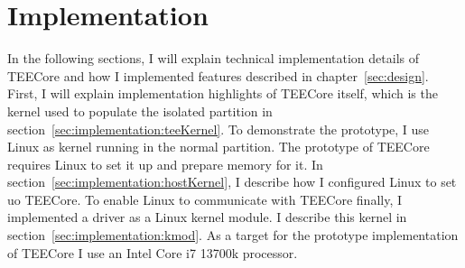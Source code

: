 \chapter{Implementation}
\label{sec:implementation}


In the following sections, I will explain technical implementation details of
TEECore and how I implemented features described in chapter~\ref{sec:design}.
First, I will explain implementation highlights of TEECore itself, which is the
kernel used to populate the isolated partition in
section~\ref{sec:implementation:teeKernel}. To demonstrate the prototype, I use
Linux as kernel running in the normal partition. The prototype of TEECore
requires Linux to set it up and prepare memory for it. In
section~\ref{sec:implementation:hostKernel}, I describe how I configured Linux
to set uo TEECore. To enable Linux to communicate with TEECore finally, I
implemented a driver as a Linux kernel module. I describe this kernel in
section~\ref{sec:implementation:kmod}. As a target for the prototype
implementation of TEECore I use an Intel Core i7 13700k processor.


